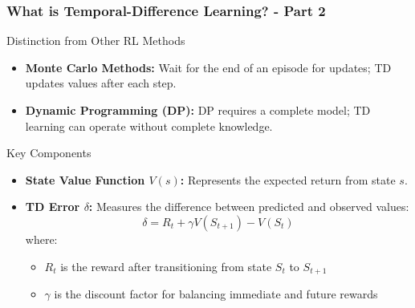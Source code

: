 \documentclass[aspectratio=169]{beamer}
\begin{document}
\begin{frame}[fragile]
    \frametitle{What is Temporal-Difference Learning? - Part 2}
    \begin{block}{Distinction from Other RL Methods}
        \begin{itemize}
            \item \textbf{Monte Carlo Methods:} Wait for the end of an episode for updates; TD updates values after each step.
            \item \textbf{Dynamic Programming (DP):} DP requires a complete model; TD learning can operate without complete knowledge.
        \end{itemize}
    \end{block}
    
    \begin{block}{Key Components}
        \begin{itemize}
            \item \textbf{State Value Function \( V(s) \):} Represents the expected return from state \( s \).
            \item \textbf{TD Error \( \delta \):} Measures the difference between predicted and observed values:
            \begin{equation}
                \delta = R_t + \gamma V(S_{t+1}) - V(S_t)
            \end{equation}
            where:
            \begin{itemize}
                \item \( R_t \) is the reward after transitioning from state \( S_t \) to \( S_{t+1} \)
                \item \( \gamma \) is the discount factor for balancing immediate and future rewards
            \end{itemize}
        \end{itemize}
    \end{block}
\end{frame}
\end{document}
